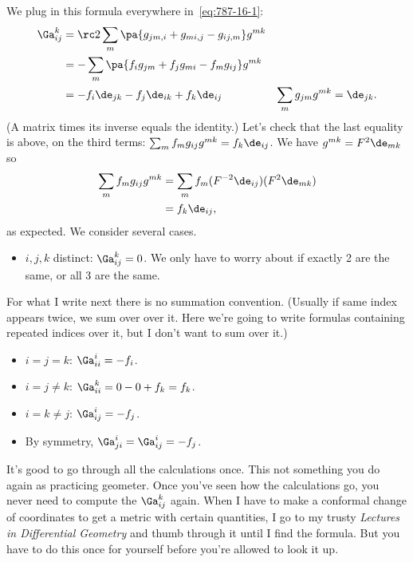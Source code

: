 We plug in this formula everywhere in~\eqref{eq:787-16-1}:%
\begin{align*}
\Ga_{ij}^k &=\rc2\sum_m \pa{g_{jm,i}+g_{mi,j} -g_{ij,m}} g^{mk}\\
&=-\sum_m \pa{f_ig_{jm} + f_j g_{mi} - f_m g_{ij}} g^{mk}\\
&=-f_i\de_{jk} -f_j \de_{ik} + f_k \de_{ij}
&\sum_m g_{jm}g^{mk} =\de_{jk}.%
\end{align*}
(A matrix times its inverse equals the identity.)
Let's check that the last equality is above, on the third terms: $\sum_m f_mg_{ij} g^{mk}=f_k\de_{ij}$. We have $g^{mk}=F^2\de_{mk}$ so 
\begin{align*}
\sum_m f_mg_{ij} g^{mk} &=\sum_m f_m (F^{-2}\de_{ij})(F^2\de_{mk})\\
&=f_k\de_{ij},
\end{align*}
as expected. 
We consider several cases.
\begin{itemize}
\item
$i,j,k$ distinct: $\Ga_{ij}^k=0$. We only have to worry about if exactly 2 are the same, or all 3 are the same. 
\end{itemize}
For what I write next there is no summation convention. (Usually if same index appears twice, we sum over over it. Here we're going to write formulas containing repeated indices over it, but I don't want to sum over it.)
\begin{itemize}
\item
$i=j=k$: $\Ga_{ii}^i=-f_i$.
\item
$i=j\ne k$:
$\Ga_{ii}^k=0-0+f_k=f_k$.
\item
$i=k\ne j$:
$\Ga_{ij}^i=-f_j$.
\item
By symmetry, $\Ga_{ji}^i=\Ga_{ij}^i=-f_j$.
\end{itemize}

It's good to go through all the calculations once. This not something you do again as practicing geometer.
Once you've seen how the calculations go, you never need to compute the $\Ga_{ij}^k$ again. When I have to make a conformal change of coordinates to get a metric with certain quantities, I go to my trusty {\it Lectures in Differential Geometry} %
and thumb through it until I find the formula. But you have to do this once for yourself before you're allowed to look it up.


